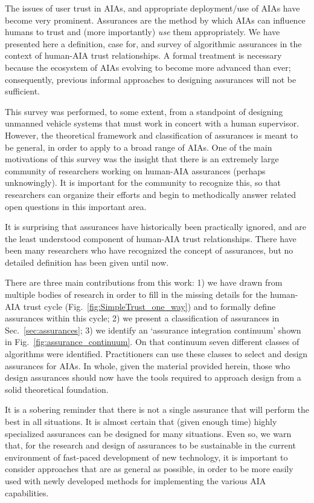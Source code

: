 The issues of user trust in AIAs, and appropriate deployment/use of AIAs have become very prominent.  Assurances are the method by which AIAs can influence humans to trust and (more importantly) \emph{use} them appropriately. We have presented here a definition, case for, and survey of algorithmic assurances in the context of human-AIA trust relationships. A formal treatment is necessary because the ecosystem of AIAs evolving to become more advanced than ever; consequently, previous informal approaches to designing assurances will not be sufficient.

This survey was performed, to some extent, from a standpoint of designing unmanned vehicle systems that must work in concert with a human supervisor. However, the theoretical framework and classification of assurances is meant to be general, in order to apply to a broad range of AIAs. One of the main motivations of this survey was the insight that there is an extremely large community of researchers working on human-AIA assurances (perhaps unknowingly). It is important for the community to recognize this, so that researchers can organize their efforts and begin to methodically answer related open questions in this important area.

It is surprising that assurances have historically been practically ignored, and are the least understood component of human-AIA trust relationships. There have been many researchers who have recognized the concept of assurances, but no detailed definition has been given until now.

There are three main contributions from this work: 1) we have drawn from multiple bodies of research in order to fill in the missing details for the human-AIA trust cycle (Fig.~\ref{fig:SimpleTrust_one_way}) and to formally define assurances within this cycle; 2) we present a classification of assurances in Sec.~\ref{sec:assurances}; 3) we identify an `assurance integration continuum' shown in Fig.~\ref{fig:assurance_continuum}. On that continuum seven different classes of algorithms were identified. Practitioners can use these classes to select and design assurances for AIAs. In whole, given the material provided herein, those who design assurances should now have the tools required to approach design from a solid theoretical foundation.

It is a sobering reminder that there is not a single assurance that will perform the best in all situations. It is almost certain that (given enough time) highly specialized assurances can be designed for many situations. Even so, we warn that, for the research and design of assurances to be sustainable in the current environment of fast-paced development of new technology, it is important to consider approaches that are as general as possible, in order to be more easily used with newly developed methods for implementing the various AIA capabilities.

